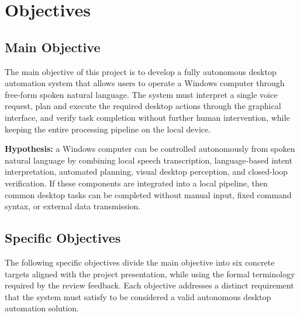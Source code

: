 \chapter{Objectives}
\setcounter{section}{0}

\section{Main Objective}

The main objective of this project is to develop a fully autonomous desktop automation system that allows users to operate a Windows computer through free-form spoken natural language. The system must interpret a single voice request, plan and execute the required desktop actions through the graphical interface, and verify task completion without further human intervention, while keeping the entire processing pipeline on the local device.

\textbf{Hypothesis:} a Windows computer can be controlled autonomously from spoken natural language by combining local speech transcription, language-based intent interpretation, automated planning, visual desktop perception, and closed-loop verification. If these components are integrated into a local pipeline, then common desktop tasks can be completed without manual input, fixed command syntax, or external data transmission.

\section{Specific Objectives}

The following specific objectives divide the main objective into six concrete targets aligned with the project presentation, while using the formal terminology required by the review feedback. Each objective addresses a distinct requirement that the system must satisfy to be considered a valid autonomous desktop automation solution.

